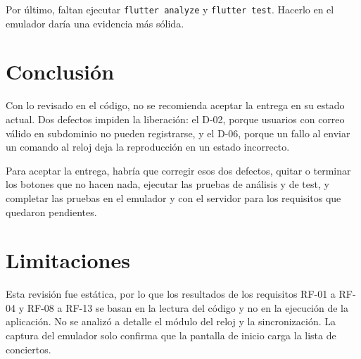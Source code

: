 \documentclass[11pt,a4paper]{article}
\begin{document}
Por último, faltan ejecutar \texttt{flutter analyze} y \texttt{flutter test}. Hacerlo en el emulador daría una evidencia más sólida.

\section*{Conclusión}

Con lo revisado en el código, no se recomienda aceptar la entrega en su estado actual. Dos defectos impiden la liberación: el D-02, porque usuarios con correo válido en subdominio no pueden registrarse, y el D-06, porque un fallo al enviar un comando al reloj deja la reproducción en un estado incorrecto.

Para aceptar la entrega, habría que corregir esos dos defectos, quitar o terminar los botones que no hacen nada, ejecutar las pruebas de análisis y de test, y completar las pruebas en el emulador y con el servidor para los requisitos que quedaron pendientes.

\section*{Limitaciones}

Esta revisión fue estática, por lo que los resultados de los requisitos RF-01 a RF-04 y RF-08 a RF-13 se basan en la lectura del código y no en la ejecución de la aplicación. No se analizó a detalle el módulo del reloj y la sincronización. La captura del emulador solo confirma que la pantalla de inicio carga la lista de conciertos.
\end{document}
